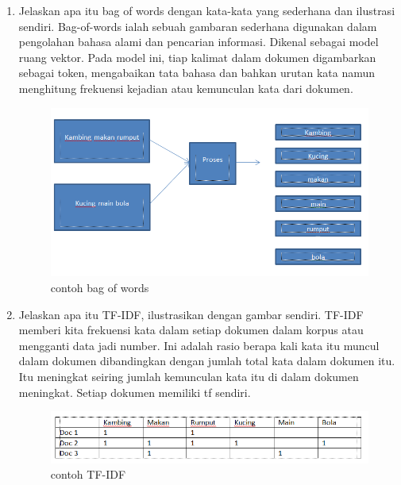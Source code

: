 \begin{enumerate}
\item Jelaskan apa itu bag of words dengan kata-kata yang sederhana dan ilustrasi sendiri.
 Bag-of-words ialah sebuah gambaran sederhana digunakan dalam pengolahan bahasa alami dan pencarian informasi. Dikenal sebagai model ruang vektor. Pada model ini, tiap kalimat dalam dokumen digambarkan sebagai token, mengabaikan tata bahasa dan bahkan urutan kata namun menghitung frekuensi kejadian atau kemunculan kata dari dokumen.
 
\begin{figure}[ht]
\centering
\includegraphics[scale=0.2]{figures/1174050/chapter4/4.PNG}
\caption{contoh bag of words}
\label{contoh}
\end{figure}

\item Jelaskan apa itu TF-IDF, ilustrasikan dengan gambar sendiri.
TF-IDF  memberi kita frekuensi kata dalam setiap dokumen dalam korpus atau mengganti data jadi number. Ini adalah rasio berapa kali kata itu muncul dalam dokumen dibandingkan dengan jumlah total kata dalam dokumen itu. Itu meningkat seiring jumlah kemunculan kata itu di dalam dokumen meningkat. Setiap dokumen memiliki tf sendiri.
 
\begin{figure}[ht]
\centering
\includegraphics[scale=0.2]{figures/1174050/chapter4/5.PNG}
\caption{contoh TF-IDF}
\label{contoh}
\end{figure}

\end{enumerate}


